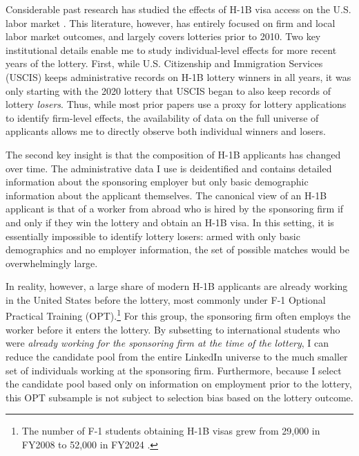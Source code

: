 Considerable past research has studied the effects of H-1B visa access on the U.S. labor market \citet{boundetal2017, doranetal2022, mahajanetal2024}. This literature, however, has entirely focused on firm and local labor market outcomes, and largely covers lotteries prior to 2010. Two key institutional details enable me to study individual-level effects for more recent years of the lottery. First, while U.S. Citizenship and Immigration Services (USCIS) keeps administrative records on H-1B lottery winners in all years, it was only starting with the 2020 lottery that USCIS began to also keep records of lottery \textit{losers}. Thus, while most prior papers use a proxy for lottery applications to identify firm-level effects, the availability of data on the full universe of applicants allows me to directly observe both individual winners and losers. 

The second key insight is that the composition of H-1B applicants has changed over time. The administrative data I use is deidentified and contains detailed information about the sponsoring employer but only basic demographic information about the applicant themselves. 
The canonical view of an H-1B applicant is that of a worker from abroad who is hired by the sponsoring firm if and only if they win the lottery and obtain an H-1B visa. In this setting, it is essentially impossible to identify lottery losers: armed with only basic demographics and no employer information, the set of possible matches would be overwhelmingly large. 


In reality, however, a large share of modern H-1B applicants are already working in the United States before the lottery, most commonly under F-1 Optional Practical Training (OPT).\footnote{The number of F-1 students obtaining H-1B visas grew from 29,000 in FY2008 to 52,000 in FY2024 .} For this group, the sponsoring firm often employs the worker before it enters the lottery. By subsetting to international students who were \textit{already working for the sponsoring firm at the time of the lottery}, I can reduce the candidate pool from the entire LinkedIn universe to the much smaller set of individuals working at the sponsoring firm.
Furthermore, because I select the candidate pool based only on information on employment prior to the lottery, this OPT subsample is not subject to selection bias based on the lottery outcome.

